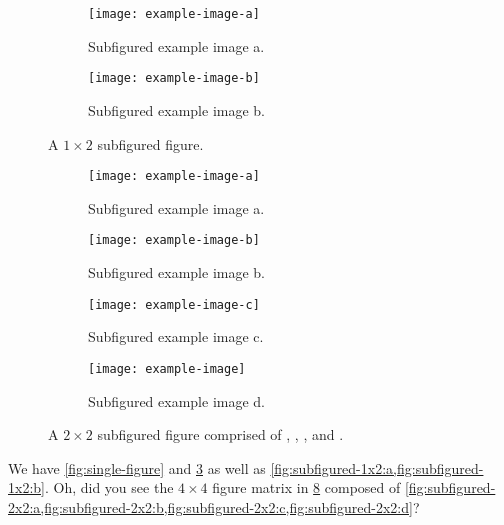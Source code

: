 \documentclass[%
  draft,%
  oneside,%
  ngerman,%
  english,%
]{iswartcl}
\begin{document}
\begin{figure}
  \centering
  \smaller[1]
  \begin{subfigure}[t]{0.49\linewidth}
    \centering
    \texttt{[image: example-image-a]}
    \caption{%
      Subfigured example image a.
    }
    \label{fig:subfigured-1x2:a}
  \end{subfigure}%
  \hfill%
  \begin{subfigure}[t]{0.49\linewidth}
    \centering
    \texttt{[image: example-image-b]}
    \caption{%
      Subfigured example image b.
    }
    \label{fig:subfigured-1x2:b}
  \end{subfigure}%
  \caption{%
    A $1 \times 2$ subfigured figure.
  }
  \label{fig:subfigured-1x2}
\end{figure}

\begin{figure}
  \centering
  \smaller[1]
  \begin{subfigure}[t]{0.49\linewidth}
    \centering
    \texttt{[image: example-image-a]}
    \caption{%
      Subfigured example image a.
    }
    \label{fig:subfigured-2x2:a}
  \end{subfigure}%
  \hfill%
  \begin{subfigure}[t]{0.49\linewidth}
    \centering
    \texttt{[image: example-image-b]}
    \caption{%
      Subfigured example image b.
    }
    \label{fig:subfigured-2x2:b}
  \end{subfigure}%
  \hfill%
  \begin{subfigure}[t]{0.49\linewidth}
    \centering
    \texttt{[image: example-image-c]}
    \caption{%
      Subfigured example image c.
    }
    \label{fig:subfigured-2x2:c}
  \end{subfigure}%
  \hfill%
  \begin{subfigure}[t]{0.49\linewidth}
    \centering
    \texttt{[image: example-image]}
    \caption{%
      Subfigured example image d.
    }
    \label{fig:subfigured-2x2:d}
  \end{subfigure}%
  \caption{%
    A $2 \times 2$ subfigured figure comprised of , , , and .
  }
  \label{fig:subfigured-2x2}
\end{figure}

We have \cref{fig:single-figure} and \cref{fig:subfigured-1x2} as well as \cref{fig:subfigured-1x2:a,fig:subfigured-1x2:b}.
Oh, did you see the $4 \times 4$ figure matrix in \cref{fig:subfigured-2x2} composed of \cref{fig:subfigured-2x2:a,fig:subfigured-2x2:b,fig:subfigured-2x2:c,fig:subfigured-2x2:d}?

\Blinddocument


\end{document}
